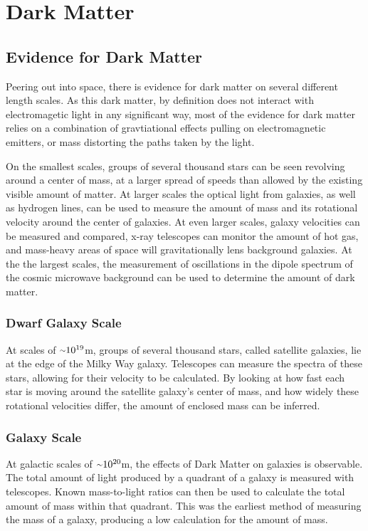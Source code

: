 \cleartooddpage[\thispagestyle{empty}]
\chapter{Dark Matter}

\section{Evidence for Dark Matter}

Peering out into space, there is evidence for dark matter on several different length scales.
As this dark matter, by definition does not interact with electromagetic light in any significant way, most of the evidence for dark matter relies on a combination of gravtiational effects pulling on electromagnetic emitters, or mass distorting the paths taken by the light.

On the smallest scales, groups of several thousand stars can be seen revolving around a center of mass, at a larger spread of speeds than allowed by the existing visible amount of matter.
At larger scales the optical light from galaxies, as well as hydrogen lines, can be used to measure the amount of mass and its rotational velocity around the center of galaxies.
At even larger scales, galaxy velocities can be measured and compared, x-ray telescopes can monitor the amount of hot gas, and mass-heavy areas of space will gravitationally lens background galaxies.
At the the largest scales, the measurement of oscillations in the dipole spectrum of the cosmic microwave background can be used to determine the amount of dark matter.


\subsection{Dwarf Galaxy Scale}
At scales of $\nicetilde 10^{19}$m, groups of several thousand stars, called satellite galaxies, lie at the edge of the Milky Way galaxy.
Telescopes can measure the spectra of these stars, allowing for their velocity to be calculated.
By looking at how fast each star is moving around the satellite galaxy's center of mass, and how widely these rotational velocities differ, the amount of enclosed mass can be inferred.

\subsection{Galaxy Scale}
%
At galactic scales of $\nicetilde 10^{20}$m, the effects of Dark Matter on galaxies is observable.
The total amount of light produced by a quadrant of a galaxy is measured with telescopes.
Known mass-to-light ratios can then be used to calculate the total amount of mass within that quadrant.
This was the earliest method of measuring the mass of a galaxy, producing a low calculation for the amount of mass.

